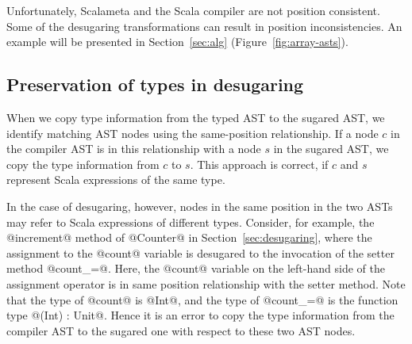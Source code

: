 \documentclass[11pt]{amsart}
\begin{document}
Unfortunately, Scalameta and the Scala compiler are not position consistent.
Some of the desugaring transformations can result in position inconsistencies.
An example will be presented in Section~\ref{sec:alg} (Figure~\ref{fig:array-asts}).



\subsection{Preservation of types in desugaring}

When we copy type information from the typed AST to the sugared AST,
we identify matching AST nodes using the same-position relationship.
If a node $c$ in the compiler AST is in this relationship with a node
$s$ in the sugared AST, we copy the type information from $c$ to $s$.
This approach is correct, if $c$ and $s$ represent Scala expressions
of the same type.

In the case of desugaring, however, nodes in the same position in the
two ASTs may refer to Scala expressions of different types. 
Consider, for example, the @increment@ method of @Counter@ in
Section~\ref{sec:desugaring}, where the assignment to the @count@ variable
is desugared to the invocation of the setter method @count_=@.
Here, the @count@ variable on the left-hand side of the assignment operator
is in same position relationship with the setter method.
Note that the type of @count@ is @Int@, and the type of @count_=@ is the
function type @(Int) : Unit@. Hence it is an error to copy the type information
from the compiler AST to the sugared one with respect to these two AST nodes.




\end{document}

